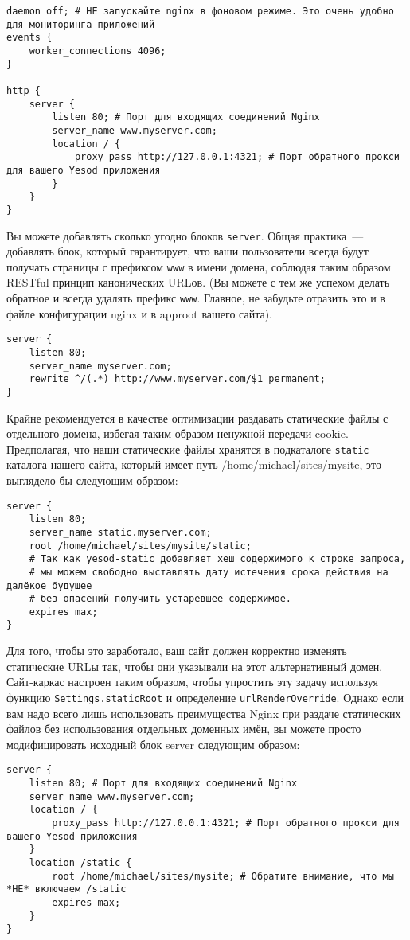 \begin{lstlisting}
daemon off; # НЕ запускайте nginx в фоновом режиме. Это очень удобно для мониторинга приложений
events {
    worker_connections 4096;
}

http {
    server {
        listen 80; # Порт для входящих соединений Nginx
        server_name www.myserver.com;
        location / {
            proxy_pass http://127.0.0.1:4321; # Порт обратного прокси для вашего Yesod приложения
        }
    }
}
\end{lstlisting}
Вы можете добавлять сколько угодно блоков \lstinline{server}. Общая
практика~--- добавлять блок, который гарантирует, что ваши пользователи всегда
будут получать страницы с префиксом \lstinline{www} в имени домена, соблюдая
таким образом RESTful принцип канонических URLов. (Вы можете с тем же успехом
делать обратное и всегда удалять префикс \lstinline{www}. Главное, не забудьте
отразить это и в файле конфигурации nginx и в approot вашего сайта).

\begin{lstlisting}
server {
    listen 80;
    server_name myserver.com;
    rewrite ^/(.*) http://www.myserver.com/$1 permanent;
}
\end{lstlisting}%

Крайне рекомендуется в качестве оптимизации раздавать статические файлы с
отдельного домена, избегая таким образом ненужной передачи cookie. Предполагая,
что наши статические файлы хранятся в подкаталоге \lstinline{static} каталога
нашего сайта, который имеет путь /home/michael/sites/mysite, это выглядело бы
следующим образом:

\begin{lstlisting}
server {
    listen 80;
    server_name static.myserver.com;
    root /home/michael/sites/mysite/static;
    # Так как yesod-static добавляет хеш содержимого к строке запроса,
    # мы можем свободно выставлять дату истечения срока действия на далёкое будущее
    # без опасений получить устаревшее содержимое.
    expires max;
}
\end{lstlisting}

Для того, чтобы это заработало, ваш сайт должен корректно изменять статические
URLы так, чтобы они указывали на этот альтернативный домен. Сайт-каркас
настроен таким образом, чтобы упростить эту задачу используя функцию
\lstinline{Settings.staticRoot} и определение \lstinline{urlRenderOverride}.
Однако если вам надо всего лишь использовать преимущества Nginx при раздаче
статических файлов без использования отдельных доменных имён, вы можете просто
модифицировать исходный блок server следующим образом:
\begin{lstlisting}
server {
    listen 80; # Порт для входящих соединений Nginx
    server_name www.myserver.com;
    location / {
        proxy_pass http://127.0.0.1:4321; # Порт обратного прокси для вашего Yesod приложения
    }
    location /static {
        root /home/michael/sites/mysite; # Обратите внимание, что мы *НЕ* включаем /static
        expires max;
    }
}
\end{lstlisting}
%

